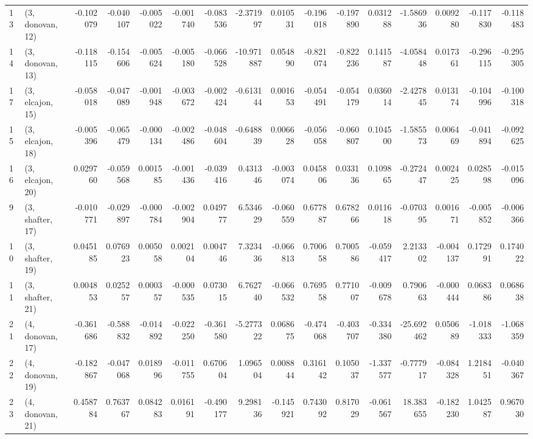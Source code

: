 \begin{tabular}{llrrrrrrrrrrrrrr}
13 &  (3, donovan, 12) & -0.102079 & -0.040107 &  -0.005022 & -0.001740 & -0.083536 &  -2.371997 &  0.010531 &  -0.196018 & -0.197890 &  0.031288 &  -1.586936 &  0.009280 & -0.117830 & -0.118483 \\
14 &  (3, donovan, 13) & -0.118115 & -0.154606 &  -0.005624 & -0.005180 & -0.066528 & -10.971887 &  0.054890 &  -0.821074 & -0.822236 &  0.141587 &  -4.058448 &  0.017361 & -0.296115 & -0.295305 \\
17 &  (3, elcajon, 15) & -0.058018 & -0.047089 &  -0.001948 & -0.003672 & -0.002424 &  -0.613144 &  0.001653 &  -0.054491 & -0.054179 &  0.036014 &  -2.427845 &  0.013174 & -0.104996 & -0.100318 \\
15 &  (3, elcajon, 18) & -0.005396 & -0.065479 &  -0.000134 & -0.002486 & -0.048604 &  -0.648839 &  0.006628 &  -0.056058 & -0.060807 &  0.104500 &  -1.585573 &  0.006469 & -0.041894 & -0.092625 \\
16 &  (3, elcajon, 20) &  0.029760 & -0.059568 &   0.001585 & -0.001436 & -0.039416 &   0.431346 & -0.003074 &   0.045806 &  0.033136 &  0.109865 &  -0.272447 &  0.002425 &  0.028598 & -0.015096 \\
9  &  (3, shafter, 17) & -0.010771 & -0.029897 &  -0.000784 & -0.002904 &  0.049777 &   6.534629 & -0.060559 &   0.677887 &  0.678266 &  0.011618 &  -0.070395 &  0.001671 & -0.005852 & -0.006366 \\
10 &  (3, shafter, 19) &  0.045185 &  0.076923 &   0.005058 &  0.002104 &  0.004746 &   7.323436 & -0.066813 &   0.700658 &  0.700586 & -0.059417 &   2.213302 & -0.004137 &  0.172991 &  0.174022 \\
11 &  (3, shafter, 21) &  0.004853 &  0.025257 &   0.000357 & -0.000535 &  0.073015 &   6.762740 & -0.066532 &   0.769558 &  0.771007 & -0.009678 &   0.790663 & -0.000444 &  0.068386 &  0.068638 \\
21 &  (4, donovan, 17) & -0.361686 & -0.588832 &  -0.014892 & -0.022250 & -0.361580 &  -5.277322 &  0.068675 &  -0.474068 & -0.403707 & -0.334380 & -25.692462 &  0.050689 & -1.018333 & -1.068359 \\
22 &  (4, donovan, 19) & -0.182867 & -0.047068 &   0.018996 & -0.011755 &  0.670604 &   1.096504 &  0.008844 &   0.316142 &  0.105037 & -1.337577 &  -0.777917 & -0.084328 &  1.218451 & -0.040367 \\
23 &  (4, donovan, 21) &  0.458784 &  0.763767 &   0.084283 &  0.016191 & -0.490177 &   9.298136 & -0.145921 &   0.743092 &  0.817029 & -0.061567 &  18.383655 & -0.182230 &  1.042587 &  0.967030 \\

\end{tabular}
